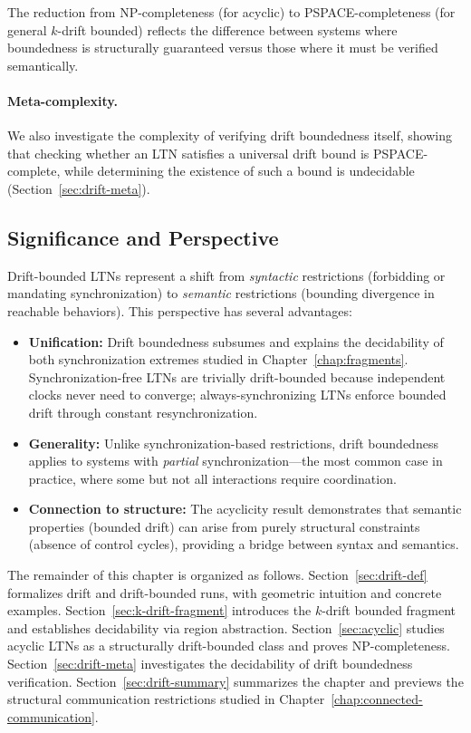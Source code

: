 The reduction from NP-completeness (for acyclic) to PSPACE-completeness (for general $k$-drift bounded) reflects the difference between systems where boundedness is structurally guaranteed versus those where it must be verified semantically.

\paragraph{Meta-complexity.} We also investigate the complexity of verifying drift boundedness itself, showing that checking whether an LTN satisfies a universal drift bound is PSPACE-complete, while determining the existence of such a bound is undecidable (Section~\ref{sec:drift-meta}).

\subsection*{Significance and Perspective}

Drift-bounded LTNs represent a shift from \emph{syntactic} restrictions (forbidding or mandating synchronization) to \emph{semantic} restrictions (bounding divergence in reachable behaviors). This perspective has several advantages:

\begin{itemize}
\item \textbf{Unification:} Drift boundedness subsumes and explains the decidability of both synchronization extremes studied in Chapter~\ref{chap:fragments}. Synchronization-free LTNs are trivially drift-bounded because independent clocks never need to converge; always-synchronizing LTNs enforce bounded drift through constant resynchronization.

\item \textbf{Generality:} Unlike synchronization-based restrictions, drift boundedness applies to systems with \emph{partial} synchronization—the most common case in practice, where some but not all interactions require coordination.

\item \textbf{Connection to structure:} The acyclicity result demonstrates that semantic properties (bounded drift) can arise from purely structural constraints (absence of control cycles), providing a bridge between syntax and semantics.
\end{itemize}

The remainder of this chapter is organized as follows. Section~\ref{sec:drift-def} formalizes drift and drift-bounded runs, with geometric intuition and concrete examples. Section~\ref{sec:k-drift-fragment} introduces the $k$-drift bounded fragment and establishes decidability via region abstraction. Section~\ref{sec:acyclic} studies acyclic LTNs as a structurally drift-bounded class and proves NP-completeness. Section~\ref{sec:drift-meta} investigates the decidability of drift boundedness verification. Section~\ref{sec:drift-summary} summarizes the chapter and previews the structural communication restrictions studied in Chapter~\ref{chap:connected-communication}.

